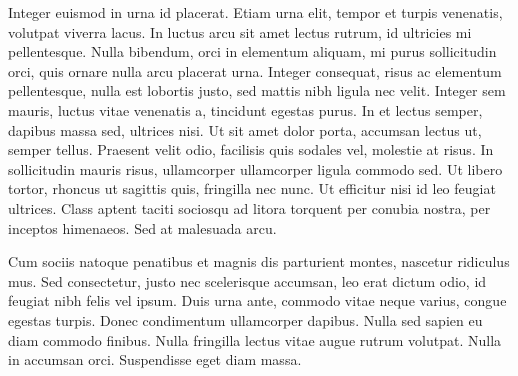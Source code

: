 Integer euismod in urna id placerat. Etiam urna elit, tempor et turpis venenatis, volutpat viverra lacus. In luctus arcu sit amet lectus rutrum, id ultricies mi pellentesque. Nulla bibendum, orci in elementum aliquam, mi purus sollicitudin orci, quis ornare nulla arcu placerat urna. Integer consequat, risus ac elementum pellentesque, nulla est lobortis justo, sed mattis nibh ligula nec velit. Integer sem mauris, luctus vitae venenatis a, tincidunt egestas purus. In et lectus semper, dapibus massa sed, ultrices nisi. Ut sit amet dolor porta, accumsan lectus ut, semper tellus. Praesent velit odio, facilisis quis sodales vel, molestie at risus. In sollicitudin mauris risus, ullamcorper ullamcorper ligula commodo sed. Ut libero tortor, rhoncus ut sagittis quis, fringilla nec nunc. Ut efficitur nisi id leo feugiat ultrices. Class aptent taciti sociosqu ad litora torquent per conubia nostra, per inceptos himenaeos. Sed at malesuada arcu.

Cum sociis natoque penatibus et magnis dis parturient montes, nascetur ridiculus mus. Sed consectetur, justo nec scelerisque accumsan, leo erat dictum odio, id feugiat nibh felis vel ipsum. Duis urna ante, commodo vitae neque varius, congue egestas turpis. Donec condimentum ullamcorper dapibus. Nulla sed sapien eu diam commodo finibus. Nulla fringilla lectus vitae augue rutrum volutpat. Nulla in accumsan orci. Suspendisse eget diam massa.